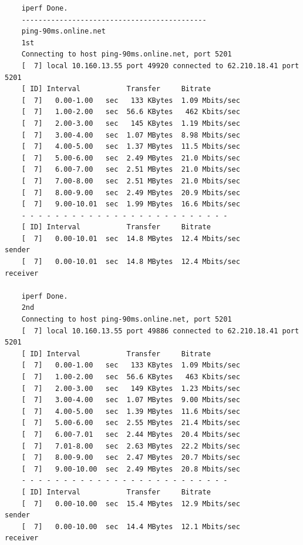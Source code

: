 \documentclass[paper=a4, fontsize=10pt]{scrartcl} %
\numberwithin{equation}{section} %
\numberwithin{figure}{section} %
\numberwithin{table}{section} %
\begin{document}
\begin{lstlisting}
    iperf Done.
    --------------------------------------------
    ping-90ms.online.net
    1st
    Connecting to host ping-90ms.online.net, port 5201
    [  7] local 10.160.13.55 port 49920 connected to 62.210.18.41 port 5201
    [ ID] Interval           Transfer     Bitrate
    [  7]   0.00-1.00   sec   133 KBytes  1.09 Mbits/sec
    [  7]   1.00-2.00   sec  56.6 KBytes   462 Kbits/sec
    [  7]   2.00-3.00   sec   145 KBytes  1.19 Mbits/sec
    [  7]   3.00-4.00   sec  1.07 MBytes  8.98 Mbits/sec
    [  7]   4.00-5.00   sec  1.37 MBytes  11.5 Mbits/sec
    [  7]   5.00-6.00   sec  2.49 MBytes  21.0 Mbits/sec
    [  7]   6.00-7.00   sec  2.51 MBytes  21.0 Mbits/sec
    [  7]   7.00-8.00   sec  2.51 MBytes  21.0 Mbits/sec
    [  7]   8.00-9.00   sec  2.49 MBytes  20.9 Mbits/sec
    [  7]   9.00-10.01  sec  1.99 MBytes  16.6 Mbits/sec
    - - - - - - - - - - - - - - - - - - - - - - - - -
    [ ID] Interval           Transfer     Bitrate
    [  7]   0.00-10.01  sec  14.8 MBytes  12.4 Mbits/sec                  sender
    [  7]   0.00-10.01  sec  14.8 MBytes  12.4 Mbits/sec                  receiver
    
    iperf Done.
    2nd
    Connecting to host ping-90ms.online.net, port 5201
    [  7] local 10.160.13.55 port 49886 connected to 62.210.18.41 port 5201
    [ ID] Interval           Transfer     Bitrate
    [  7]   0.00-1.00   sec   133 KBytes  1.09 Mbits/sec
    [  7]   1.00-2.00   sec  56.6 KBytes   463 Kbits/sec
    [  7]   2.00-3.00   sec   149 KBytes  1.23 Mbits/sec
    [  7]   3.00-4.00   sec  1.07 MBytes  9.00 Mbits/sec
    [  7]   4.00-5.00   sec  1.39 MBytes  11.6 Mbits/sec
    [  7]   5.00-6.00   sec  2.55 MBytes  21.4 Mbits/sec
    [  7]   6.00-7.01   sec  2.44 MBytes  20.4 Mbits/sec
    [  7]   7.01-8.00   sec  2.63 MBytes  22.2 Mbits/sec
    [  7]   8.00-9.00   sec  2.47 MBytes  20.7 Mbits/sec
    [  7]   9.00-10.00  sec  2.49 MBytes  20.8 Mbits/sec
    - - - - - - - - - - - - - - - - - - - - - - - - -
    [ ID] Interval           Transfer     Bitrate
    [  7]   0.00-10.00  sec  15.4 MBytes  12.9 Mbits/sec                  sender
    [  7]   0.00-10.00  sec  14.4 MBytes  12.1 Mbits/sec                  receiver
    

\end{lstlisting}
\end{document}
